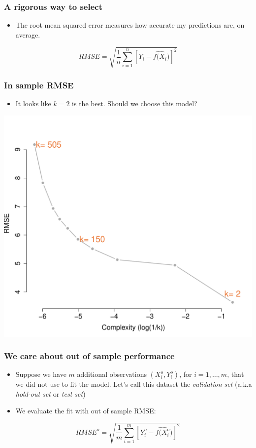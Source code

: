 \documentclass{beamer}
\newcommand{\bo}[1]{\textcolor{burntorange}{#1}}
\begin{document}
\begin{frame}[plain]
\frametitle{A rigorous way to select}
\begin{itemize}
	\item The \bo{root mean squared error} measures how accurate my predictions are, on average.
\end{itemize}
\vspace{15mm}
$$
RMSE = \sqrt{\frac{1}{n} \sum_{i=1}^n \left[Y_i - \widehat{f(X_i})\right]^2}
$$

\end{frame}

\begin{frame}[plain]
\frametitle{In sample RMSE}
\vspace{5mm}
\begin{itemize}
\item[] It looks like \bo{$k=2$} is the best. Should we choose this model?
\end{itemize}
\vspace{-9mm}
\begin{center}
\includegraphics[scale=.39]{DaveBostonplotINMSE.pdf}
\end{center}
\end{frame}

\begin{frame}[plain]
\frametitle{We care about \bo{out of sample} performance}
\vspace{5mm}
\begin{itemize}
	\item Suppose we have $m$ additional observations  $(X^o_i,Y^o_i)$, for $i=1,\dots,m$, \bo{that we did not use to fit the model}. Let's call this dataset the \bo{{\it validation set} }(a.k.a {\it hold-out set} or {\it test set})\vspace{9mm}\pause
	\item We evaluate the fit with \bo{out of sample} RMSE:
\end{itemize}
\vspace{8mm}
$$
RMSE^o = \sqrt{\frac{1}{m} \sum_{i=1}^m \left[Y^o_i - \widehat{f(X^o_i})\right]^2}
$$
\end{frame}
\end{document}
